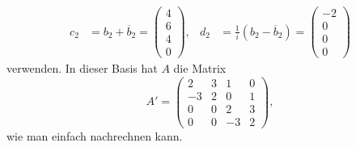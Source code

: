 \begin{loesung}
\begin{align*}
c_2
&=
b_2+\overline{b}_2 = \begin{pmatrix}4\\6\\4\\0\end{pmatrix},&
d_2
&=
\frac{1}{i}(b_2-\overline{b}_2) = \begin{pmatrix}-2\\0\\0\\0\end{pmatrix}
\end{align*}
verwenden.
In dieser Basis hat $A$ die Matrix
\[
A'
=
\begin{pmatrix}
 2& 3& 1& 0\\
-3& 2& 0& 1\\
 0& 0& 2& 3\\
 0& 0&-3& 2
\end{pmatrix},
\]
wie man einfach nachrechnen kann.
\end{loesung}

